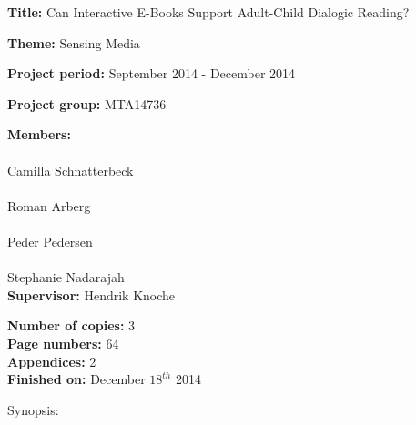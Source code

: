 \begin{minipage}[t]{0.48\textwidth}
\textbf{Title:}  %
\newline
Can Interactive E-Books Support Adult-Child Dialogic Reading? \newline

\textbf{Theme:} %
\newline
Sensing Media \newline

\textbf{Project period:} %
\newline
September 2014 - December 2014\newline

\textbf{Project group:} %
\newline
MTA14736
\newline

\textbf{Members:} \\
\underline{\hspace*{5cm}} \\
Camilla Schnatterbeck \\
\underline{\hspace*{5cm}} \\
Roman Arberg \\
\underline{\hspace*{5cm}} \\
Peder Pedersen \\
\underline{\hspace*{5cm}} \\
Stephanie Nadarajah \\

\textbf{Supervisor:} %
\newline
Hendrik Knoche
\vspace*{1cm}

\textbf{Number of copies:} 3 \\
\textbf{Page numbers:} 64 \\
\textbf{Appendices:} 2 \\ 
\textbf{Finished on:} December $18^{th}$ 2014

\end{minipage}
\hfill
\begin{minipage}[t]{0.483\textwidth}
Synopsis: \\[5pt]
\fbox{\parbox{7cm}{\bigskip\bigskip}}
\end{minipage}

